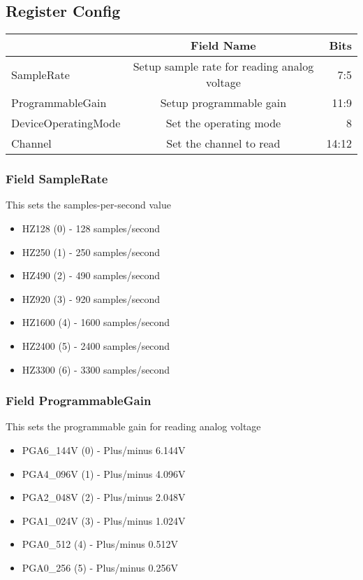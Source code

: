 \documentclass[a4paper,12pt,oneside,pdflatex,italian,final,twocolumn]{article}
\begin{document}
 


\raggedright

\subsection{Register Config}
\centering
\begin{tabular}{lcr}
\toprule
  & Field Name & Bits \\
\midrule
SampleRate & Setup sample rate for reading analog voltage & 
7:5
\\
ProgrammableGain & Setup programmable gain & 
11:9
\\
DeviceOperatingMode & Set the operating mode & 
8
\\
Channel & Set the channel to read & 
14:12
\\
\bottomrule

\end{tabular}


\raggedright

\subsubsection{Field SampleRate }

This sets the samples-per-second value


\begin{itemize}
\item HZ128 (0) - 128 samples/second
\item HZ250 (1) - 250 samples/second
\item HZ490 (2) - 490 samples/second
\item HZ920 (3) - 920 samples/second
\item HZ1600 (4) - 1600 samples/second
\item HZ2400 (5) - 2400 samples/second
\item HZ3300 (6) - 3300 samples/second
\end{itemize}


\raggedright

\subsubsection{Field ProgrammableGain }

This sets the programmable gain for reading analog voltage


\begin{itemize}
\item PGA6\_144V (0) - Plus/minus 6.144V
\item PGA4\_096V (1) - Plus/minus 4.096V
\item PGA2\_048V (2) - Plus/minus 2.048V
\item PGA1\_024V (3) - Plus/minus 1.024V
\item PGA0\_512 (4) - Plus/minus 0.512V
\item PGA0\_256 (5) - Plus/minus 0.256V
\end{itemize}
\end{document}
